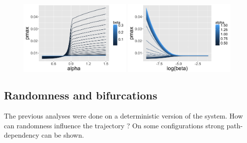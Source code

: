 \begin{figure}
\centering
\includegraphics[width=0.49\textwidth]{figuresraw/pmax_alpha}
\includegraphics[width=0.49\textwidth]{figuresraw/pmax_logbeta}
\caption{}
\label{fig:pmax}
\end{figure}



\subsection*{Randomness and bifurcations}

The previous analyses were done on a deterministic version of the system. How can randomness influence the trajectory ? On some configurations strong path-dependency can be shown.









